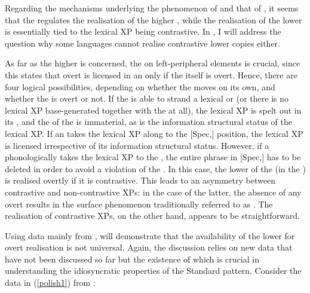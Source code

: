 Regarding the mechanisms underlying the phenomenon of  and that of , it seems that the  regulates the realisation of the higher , while the realisation of the lower  is essentially tied to the lexical XP being contrastive. In , I will address the question why some languages cannot realise contrastive lower copies either.

As far as the higher  is concerned, the  on left-peripheral elements is crucial, since this states that overt  is licensed in an  only if the  itself is overt. Hence, there are four logical possibilities, depending on whether the  moves on its own, and whether the  is overt or not. If the  is able to strand a lexical  or  (or there is no lexical XP base-generated together with the  at all), the lexical XP is spelt out in its , and the  of the  is immaterial, as is the information structural status of the lexical XP. If an  takes the lexical XP along to the [Spec,] position, the lexical XP is licensed irrespective of its information structural status. However, if a phonologically  takes the lexical XP to the  , the entire phrase in [Spec,] has to be deleted in order to avoid a violation of the . In this case, the lower  of the  (in the ) is realised overtly if it is contrastive. This leads to an asymmetry between contrastive and non-contrastive XPs: in the case of the latter, the absence of any overt  results in the surface phenomenon traditionally referred to as . The realisation of contrastive XPs, on the other hand, appears to be straightforward. 

Using data mainly from ,  will demonstrate that the availability of the lower  for overt realisation is not universal. Again, the discussion relies on new data that have not been discussed so far but the existence of which is crucial in understanding the idiosyncratic properties of the Standard  pattern. Consider the data in (\ref{polish1}) from :

\ea \label{polish1}
\z
\z


